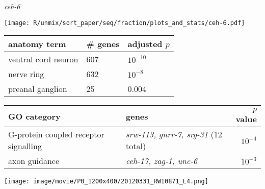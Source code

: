 \documentclass[serif,9pt]{beamer}
\begin{document}
\begin{frame}{{\em ceh-6}}

\begin{minipage}{0.4\textwidth}
\texttt{[image: R/unmix/sort\_paper/seq/fraction/plots\_and\_stats/ceh-6.pdf]}
\end{minipage}
\begin{minipage}{0.58\textwidth}
\begin{table}[!tbp]\scriptsize
\begin{tabular}{lll}
anatomy term & \# genes & adjusted $p$ \\
\hline
ventral cord neuron & 607 & $10^{-10}$ \\
nerve ring & 632 & $10^{-8}$ \\
preanal ganglion & 25 & 0.004 \\
\end{tabular}
\end{table}
\end{minipage}

\begin{table}\footnotesize
\begin{tabular}{llr}
GO category & genes & $p$ value \\
\hline
G-protein coupled receptor signalling & {\em srw-113, gnrr-7, srg-31} (12 total) & $10^{-4}$ \\
axon guidance & {\em ceh-17, zag-1, unc-6} & $10^{-3}$ \\
\end{tabular}
\end{table}

\texttt{[image: image/movie/P0\_1200x400/20120331\_RW10871\_L4.png]}

\end{frame}
\end{document}
